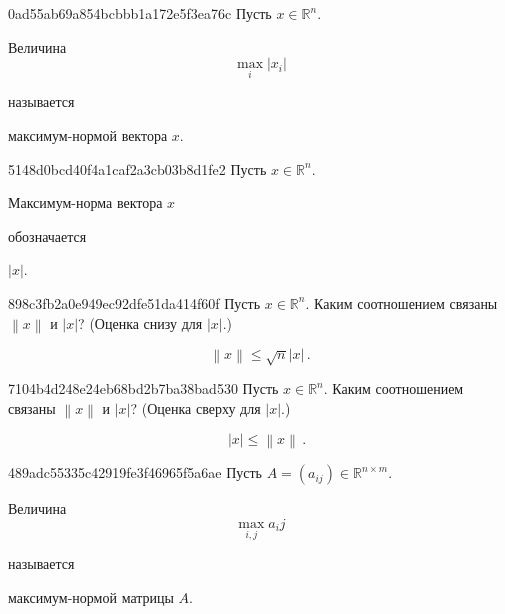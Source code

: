 \begin{note}{0ad55ab69a854bcbbb1a172e5f3ea76c}
    Пусть \({ x \in \mathbb R^{n} }\).
    \begin{icloze}{2}
        Величина
        \[
            \max_i \left\lvert x_i \right\rvert
        \]
    \end{icloze}
    называется \begin{icloze}{1}максимум-нормой вектора \({ x }\).\end{icloze}
\end{note}

\begin{note}{5148d0bcd40f4a1caf2a3cb03b8d1fe2}
    Пусть \({ x \in \mathbb R^{n} }\).
    \begin{icloze}{2}Максимум-норма вектора \({ x }\)\end{icloze} обозначается \begin{icloze}{1}\({ \left\lvert x \right\rvert }\).\end{icloze}
\end{note}

\begin{note}{898c3fb2a0e949ec92dfe51da414f60f}
    Пусть \({ x \in \mathbb R^{n} }\).
    Каким соотношением связаны \({ \left\lVert x \right\rVert }\) и \({ \left\lvert x \right\rvert }\)?
    (Оценка снизу для \({ \left\lvert x \right\rvert }\).)

    \begin{cloze}{1}
        \[
            \left\lVert x \right\rVert \leqslant \sqrt{n} \left\lvert x \right\rvert\,.
        \]
    \end{cloze}
\end{note}

\begin{note}{7104b4d248e24eb68bd2b7ba38bad530}
    Пусть \({ x \in \mathbb R^{n} }\).
    Каким соотношением связаны \({ \left\lVert x \right\rVert }\) и \({ \left\lvert x \right\rvert }\)?
    (Оценка сверху для \({ \left\lvert x \right\rvert }\).)

    \begin{cloze}{1}
        \[
            \quad \left\lvert x \right\rvert \leqslant \left\lVert x \right\rVert\,.
        \]
    \end{cloze}
\end{note}

\begin{note}{489adc55335c42919fe3f46965f5a6ae}
    Пусть \({ A = (a_{ij}) \in \mathbb R^{n \times m} }\).
    \begin{icloze}{2}
        Величина
        \[
            \max_{i,j} a_ij
        \]
    \end{icloze}
    называется \begin{icloze}{1}максимум-нормой матрицы \({ A }\).\end{icloze}
\end{note}


